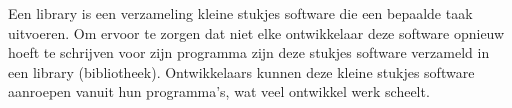 Een library is een verzameling kleine stukjes software die een bepaalde taak uitvoeren. Om ervoor te zorgen dat niet elke ontwikkelaar deze software opnieuw hoeft te schrijven voor zijn programma zijn deze stukjes software verzameld in een library (bibliotheek). Ontwikkelaars kunnen deze kleine stukjes software aanroepen vanuit hun programma's, wat veel ontwikkel werk scheelt.

